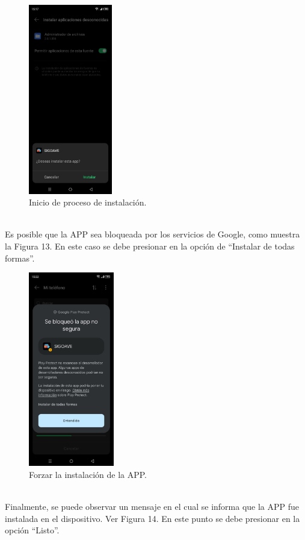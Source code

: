 \documentclass[a4paper,10pt, oneside, titlepage]{article}
\begin{document}
	\begin{figure}[!h]
		\centering
		\includegraphics[width = 0.45\linewidth, height = 8.3cm]{12.jpeg}
		\caption{Inicio de proceso de instalación.}
	\end{figure}\\
	Es posible que la APP sea bloqueada por los servicios de Google, como muestra la Figura 13. En este caso se debe presionar en la opción de ``Instalar de todas formas''.
	\begin{figure}[!h]
		\centering
		\includegraphics[width = 0.45\linewidth, height = 8.5cm]{13.jpeg}
		\caption{Forzar la instalación de la APP.}
	\end{figure}\\
	Finalmente, se puede observar un mensaje en el cual se informa que la APP fue instalada en el dispositivo. Ver Figura 14. En este punto se debe presionar en la opción ``Listo''.
\end{document}
